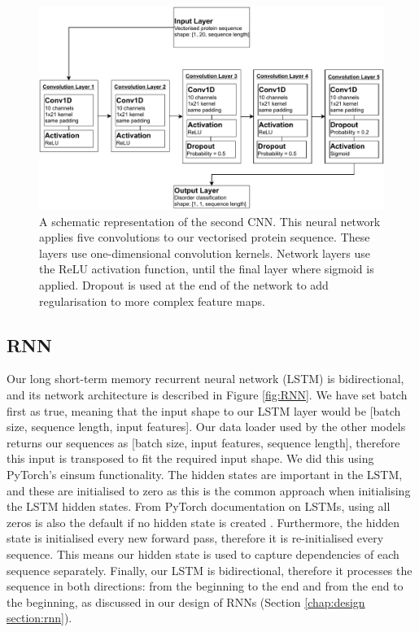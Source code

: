 \documentclass{l4proj}
\begin{document}
\begin{figure}
    \centering
    \includegraphics[width=0.95\linewidth]{images/1DCNNdraw.pdf}    

    \caption{A schematic representation of the second CNN. This neural network applies five convolutions to our vectorised protein sequence. These layers use one-dimensional convolution kernels. Network layers use the ReLU activation function, until the final layer where sigmoid is applied. Dropout is used at the end of the network to add regularisation to more complex feature maps.}

    \label{fig:1DCNN} 
\end{figure}


\subsection{RNN}

Our long short-term memory recurrent neural network (LSTM) is bidirectional, and its network architecture is described in Figure \ref{fig:RNN}. We have set batch first as true, meaning that the input shape to our LSTM layer would be [batch size, sequence length, input features]. Our data loader used by the other models returns our sequences as [batch size, input features, sequence length], therefore this input is transposed to fit the required input shape. We did this using PyTorch’s einsum functionality. The hidden states are important in the LSTM, and these are initialised to zero as this is the common approach when initialising the LSTM hidden states. From PyTorch documentation on LSTMs, using all zeros is also the default if no hidden state is created \citep{pytorch}. Furthermore, the hidden state is initialised every new forward pass, therefore it is re-initialised every sequence. This means our hidden state is used to capture dependencies of each sequence separately. Finally, our LSTM is bidirectional, therefore it processes the sequence in both directions: from the beginning to the end and from the end to the beginning, as discussed in our design of RNNs (Section \ref{chap:design section:rnn}).
\end{document}
